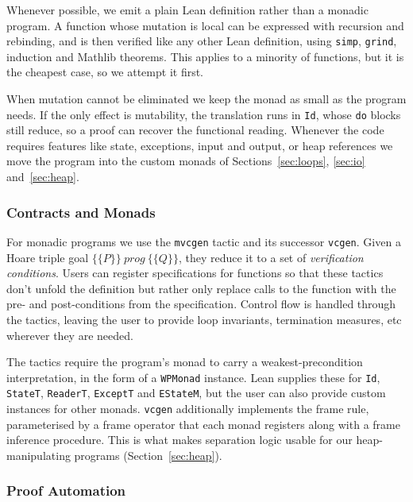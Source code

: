 \documentclass{article}
\newcommand{\code}{\lstinline}
\begin{document}
{Whenever possible, we emit a plain Lean definition rather than a monadic program. A function whose
mutation is local can be expressed with recursion and rebinding, and is then verified like
any other Lean definition, using \code{simp}, \code{grind}, induction and Mathlib theorems. This applies to a
minority of functions, but it is the cheapest case, so we attempt it first. 

When mutation cannot be
eliminated we keep the monad as small as the program needs. If the only effect is mutability, the
translation runs in \code{Id}, whose \code{do} blocks still reduce, so a proof can recover the
functional reading. Whenever the code requires features like state, exceptions, input and output, or heap references we move the program
into the custom monads of Sections~\ref{sec:loops}, \ref{sec:io} and~\ref{sec:heap}.

\subsubsection{Contracts and Monads}

For monadic programs we use the \code{mvcgen} tactic and its successor \code{vcgen}. Given a Hoare triple goal
$\lbrace\!\lbrace P \rbrace\!\rbrace\ \mathit{prog}\ \lbrace\!\lbrace Q \rbrace\!\rbrace$, they reduce
it to a set of \emph{verification conditions}. Users can register specifications for functions so that these tactics don't unfold the definition but rather only replace calls to the function with the pre- and post-conditions from the specification. Control flow is handled through the tactics, leaving the user to provide loop invariants, termination measures, etc wherever they are needed.

The tactics require the program's monad to carry a weakest-precondition interpretation, in the form of
a \code{WPMonad} instance. Lean supplies these for \code{Id}, \code{StateT}, \code{ReaderT},
\code{ExceptT} and \code{EStateM}, but the user can also provide custom instances for other monads. \code{vcgen} additionally implements the frame rule, parameterised by a frame operator that each monad
registers along with a frame inference procedure. This is what makes separation logic usable for
our heap-manipulating programs (Section~\ref{sec:heap}).

\subsubsection{Proof Automation}\label{sec:proofautomation}

}
\end{document}
